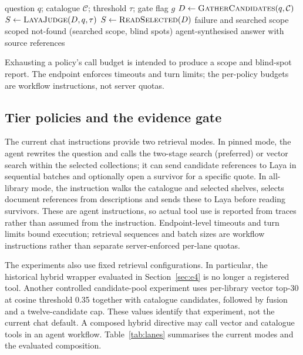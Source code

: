 \begin{algorithm}[t]
\caption{Tiered access with optional evidence gate}
\label{alg:tiered}
\begin{algorithmic}[1]
\Require question $q$; catalogue $\mathcal{C}$; threshold $\tau$; gate flag $g$
\State $D \gets \textsc{GatherCandidates}(q,\mathcal{C})$ 
  \State $S \gets \textsc{LayaJudge}(D,q,\tau)$ 
\Else
  \State $S \gets \textsc{ReadSelected}(D)$
\EndIf
{}
  \State \Return failure and searched scope
  \State \Return scoped not-found (searched scope, blind spots)
\Else
  \State \Return agent-synthesised answer with source references
\EndIf
\end{algorithmic}
\end{algorithm}
Exhausting a policy's call budget is intended to produce a scope and blind-spot
report. The endpoint enforces timeouts and turn limits; the per-policy budgets
are workflow instructions, not server quotas.

\subsection{Tier policies and the evidence gate}
\label{sec:trace}
\label{sec:gate}
\label{sec:gate-primitive}
\label{sec:twostage}

The current chat instructions provide two retrieval modes. In pinned mode,
the agent rewrites the question and calls the two-stage search (preferred) or
vector search within the selected collections; it can send candidate references
to Laya in sequential batches and optionally open a survivor for a specific
quote. In all-library mode, the instruction walks the catalogue and selected
shelves, selects document references from descriptions and sends these to Laya
before reading survivors. These are agent instructions, so actual tool use is
reported from traces rather than assumed from the instruction. Endpoint-level
timeouts and turn limits bound execution; retrieval sequences and batch sizes
are workflow instructions rather than separate server-enforced per-lane quotas.

The experiments also use fixed retrieval configurations. In particular, the
historical hybrid wrapper evaluated in Section~\ref{sec:e4} is no longer a
registered tool. Another controlled candidate-pool experiment uses per-library
vector top-30 at cosine threshold 0.35 together with catalogue candidates,
followed by fusion and a twelve-candidate cap. These values identify that
experiment, not the current chat default. A composed hybrid directive may call
vector and catalogue tools in an agent workflow. Table~\ref{tab:lanes}
summarises the current modes and the evaluated composition.


